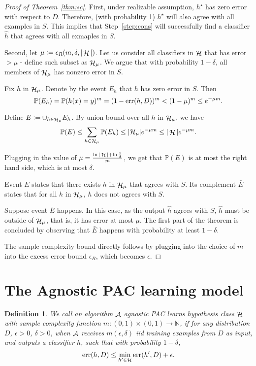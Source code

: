 \documentclass{article}
\newtheorem{definition}{Definition}
\DeclareMathOperator*{\err}{{\rm err}}
\DeclareMathOperator*{\Hcal}{{\cal H}}
\DeclareMathOperator*{\Acal}{{\cal A}}
\newcommand{\PP}{\mathbb{P}}
\newcommand{\NN}{\mathbb{N}}
\begin{document}
\begin{proof}[Proof of Theorem~\ref{thm:sc}]

  First, under realizable assumption, $h^\star$ has zero error with respect to $D$. Therefore, (with probability 1) $h^\star$ will also agree with all examples in $S$.
  This implies that Step~\ref{step:cons} will successfully find a classifier $\hat{h}$ that agrees with all exmaples in $S$.

  Second, let $\mu:= \epsilon_R(m,\delta,|\Hcal|)$. Let us consider all classifiers in $\Hcal$ that has error $> \mu$ - define such subset as $\Hcal_\mu$. We argue that with probability $1-\delta$, all members of $\Hcal_\mu$ has nonzero error in $S$.

  Fix $h$ in $\Hcal_\mu$. Denote by the event $E_h$ that $h$ has zero error in $S$. Then
  \[ \PP(E_h) = \PP(h(x) = y)^m = (1 - \err(h, D))^m < (1 - \mu)^m
  \leq e^{-\mu m}. \]

  Define $E := \cup_{h \in \Hcal_\mu} E_h$.
  By union bound over all $h$ in $\Hcal_\mu$, we have
  \[ \PP(E) \leq \sum_{h \in \Hcal_\mu} \PP(E_h) \leq |\mathcal{H}_{\mu}| e^{-\mu m} \leq |\Hcal| e^{-\mu m}. \]

  Plugging in the value of $\mu = \frac{\ln|\Hcal| + \ln\frac{1}{\delta}}{m}$, we get that $\PP(E)$ is at most the right hand side, which is at most $\delta$.

  Event $E$ states that there exists $h$ in $\Hcal_\mu$ that agrees with $S$. Its complement $\bar{E}$ states that for all $h$ in $\Hcal_\mu$, $h$ does not agrees with $S$.

  Suppose event $\bar{E}$ happens. In this case, as the output $\hat{h}$ agrees with $S$, $\hat{h}$ must be outside of $\Hcal_\mu$, that is, it has error at most $\mu$. The first part of the theorem is concluded by observing that $\bar{E}$ happens with probability at least $1-\delta$.

  The sample complexity bound directly follows by plugging into the choice of $m$ into
  the excess error bound $\epsilon_R$, which becomes $\epsilon$.

\end{proof}

\section{The Agnostic PAC learning model}

\begin{definition}
We call an algorithm $\Acal$ agnostic PAC learns hypothesis class $\Hcal$ with sample complexity
function $m: (0,1) \times (0,1) \to \NN$, if for any distribution $D$, $\epsilon > 0$, $\delta > 0$,
when $\Acal$ receives $m(\epsilon, \delta)$ iid training examples from $D$ as input,
 and outputs
a classifier $h$, such that with probability $1-\delta$,
\[ \err(h, D) \leq \min_{h' \in \Hcal} \err(h',D) + \epsilon. \]
\end{definition}
\end{document}
